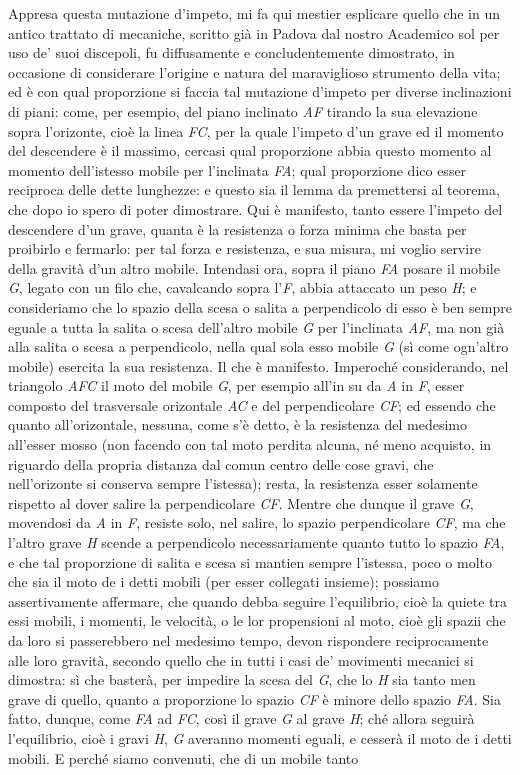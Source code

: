 \documentclass[11pt,twoside,openany]{book}
\begin{document}
Appresa questa mutazione d'impeto, mi fa qui mestier esplicare quello che in un antico trattato di mecaniche, scritto già in Padova dal nostro Academico sol per uso de' suoi discepoli, fu diffusamente e concludentemente dimostrato, in occasione di considerare l'origine e natura del maraviglioso strumento della vita; ed è con qual proporzione si faccia tal mutazione d'impeto per diverse inclinazioni di piani: come, per esempio, del piano inclinato \emph{AF} tirando la sua elevazione sopra l'orizonte, cioè la linea \emph{FC}, per la quale l'impeto d'un grave ed il momento del descendere è il massimo, cercasi qual proporzione abbia questo momento al momento dell'istesso mobile per l'inclinata \emph{FA}; qual proporzione dico esser reciproca delle dette lunghezze: e questo sia il lemma da premettersi al teorema, che dopo io spero di poter dimostrare. Qui è manifesto, tanto essere l'impeto del descendere d'un grave, quanta è la resistenza o forza minima che basta per proibirlo e fermarlo: per tal forza e resistenza, e sua misura, mi voglio servire della gravità d'un altro mobile. Intendasi ora, sopra il piano \emph{FA} posare il mobile \emph{G}, legato con un filo che, cavalcando sopra l'\emph{F}, abbia attaccato un peso \emph{H}; e consideriamo che lo spazio della scesa o salita a perpendicolo di esso è ben sempre eguale a tutta la salita o scesa dell'altro mobile \emph{G} per l'inclinata \emph{AF}, ma non già alla salita o scesa a perpendicolo, nella qual sola esso mobile \emph{G} (sì come ogn'altro mobile) esercita la sua resistenza. Il che è manifesto. Imperoché considerando, nel triangolo \emph{AFC} il moto del mobile \emph{G}, per esempio all'in su da \emph{A} in \emph{F}, esser composto del trasversale orizontale \emph{AC} e del perpendicolare \emph{CF}; ed essendo che quanto all'orizontale, nessuna, come s'è detto, è la resistenza del medesimo all'esser mosso (non facendo con tal moto perdita alcuna, né meno acquisto, in riguardo della propria distanza dal comun centro delle cose gravi, che nell'orizonte si conserva sempre l'istessa); resta, la resistenza esser solamente rispetto al dover salire la perpendicolare \emph{CF}. Mentre che dunque il grave \emph{G}, movendosi da \emph{A} in \emph{F}, resiste solo, nel salire, lo spazio perpendicolare \emph{CF}, ma che l'altro grave \emph{H} scende a perpendicolo necessariamente quanto tutto lo spazio \emph{FA}, e che tal proporzione di salita e scesa si mantien sempre l'istessa, poco o molto che sia il moto de i detti mobili (per esser collegati insieme); possiamo assertivamente affermare, che quando debba seguire l'equilibrio, cioè la quiete tra essi mobili, i momenti, le velocità, o le lor propensioni al moto, cioè gli spazii che da loro si passerebbero nel medesimo tempo, devon rispondere reciprocamente alle loro gravità, secondo quello che in tutti i casi de' movimenti mecanici si dimostra: sì che basterà, per impedire la scesa del \emph{G}, che lo \emph{H} sia tanto men grave di quello, quanto a proporzione lo spazio \emph{CF} è minore dello spazio \emph{FA}. Sia fatto, dunque, come \emph{FA} ad \emph{FC}, così il grave \emph{G} al grave \emph{H}; ché allora seguirà l'equilibrio, cioè i gravi \emph{H}, \emph{G} averanno momenti eguali, e cesserà il moto de i detti mobili. E perché siamo convenuti, che di un mobile tanto 
\end{document}
